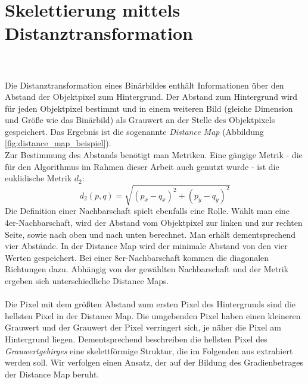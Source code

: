 \section{Skelettierung mittels Distanztransformation}
\label{sec:distanztransformation}
\\\\
Die Distanztransformation eines Binärbildes enthält Informationen über den Abstand der Objektpixel zum Hintergrund. Der Abstand zum Hintergrund wird für jeden Objektpixel bestimmt und in einem
weiteren Bild (gleiche Dimension und Größe wie das Binärbild) als Grauwert an der Stelle des Objektpixels gespeichert. Das Ergebnis ist die sogenannte \emph{Distance Map} (Abbildung \ref{fig:distance_map_beispiel}). \\
Zur Bestimmung des Abstands benötigt man Metriken. Eine gängige Metrik - die für den Algorithmus im Rahmen dieser Arbeit auch genutzt wurde - ist die euklidische Metrik $d_2$:
\begin{equation}
\label{eq:d2}
d_2(p,q) = \sqrt{(p_x - q_x)^2 + (p_y - q_y)^2}  
\end{equation}
Die Definition einer Nachbarschaft spielt
ebenfalls eine Rolle. Wählt man eine
4er-Nachbarschaft, wird der Abstand vom Objektpixel zur linken und zur rechten Seite, sowie nach oben und nach unten berechnet. Man erhält dementsprechend
vier Abstände. In der Distance Map wird der minimale Abstand von den vier Werten gespeichert. Bei einer 8er-Nachbarschaft
kommen die diagonalen Richtungen dazu. Abhängig von der gewählten
Nachbarschaft und der Metrik ergeben sich unterschiedliche Distance
Maps.\\\\
Die Pixel mit dem größten Abstand zum ersten Pixel des Hintergrunds sind die hellsten Pixel in der Distance Map. Die umgebenden Pixel haben einen kleineren Grauwert und der Grauwert der Pixel verringert sich, je näher die Pixel am Hintergrund liegen.
Dementsprechend beschreiben die hellsten Pixel des \emph{Grauwertgebirges} eine skelettförmige Struktur, die im Folgenden aus extrahiert werden soll.
Wir verfolgen einen Ansatz, der auf der Bildung des Gradienbetrages der Distance Map beruht.\\
